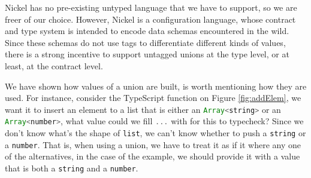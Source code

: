 \documentclass[sigplan,10pt,review,anonymous]{acmart}
\newcommand{\resolved}[2]{}
\newcommand{\typescript}[1]{\lstinline[language=JavaScript]{#1}}
\begin{document}


Nickel has no pre-existing untyped language that we have to
support, so we are freer of our choice.
However, Nickel is a configuration language, whose contract and type system
is intended to encode data schemas encountered in the wild. Since these schemas do not use
tags to differentiate different kinds of values, there is a strong incentive to support untagged unions at the
type level, or at least, at the contract level.

We have shown how values of a union are built, is worth mentioning
how they are used.
For instance, consider the TypeScript function on Figure \ref{fig:addElem},
we want it to insert an element to a list that is either an
\typescript{Array<string>} or an \typescript{Array<number>},
what value could we fill \typescript{...} with for this to typecheck?
Since we don't know what's the shape of \typescript{list},
we can't know whether to push a \typescript{string} or a
\typescript{number}.
That is, when using a union, we have to treat it as if it where any one
of the alternatives, in the case of the example, we should provide
it with a value that is both a \typescript{string} and a \typescript{number}.
\end{document}
